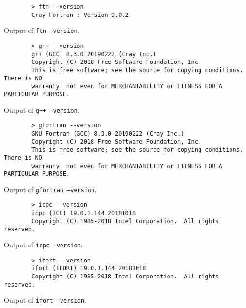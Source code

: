 \documentclass[british]{scrreprt}
\begin{document}
\begin{listing}
	\centering
	\begin{verbatim}
		> ftn --version
		Cray Fortran : Version 9.0.2
	\end{verbatim}
	\caption{Output of \texttt{ftn --version}.}
\end{listing}

\begin{listing}
	\centering
	\begin{verbatim}
		> g++ --version
		g++ (GCC) 8.3.0 20190222 (Cray Inc.)
		Copyright (C) 2018 Free Software Foundation, Inc.
		This is free software; see the source for copying conditions.  There is NO
		warranty; not even for MERCHANTABILITY or FITNESS FOR A PARTICULAR PURPOSE.

	\end{verbatim}
	\caption{Output of \texttt{g++ --version}.}
\end{listing}

\begin{listing}
	\centering
	\begin{verbatim}
		> gfortran --version
		GNU Fortran (GCC) 8.3.0 20190222 (Cray Inc.)
		Copyright (C) 2018 Free Software Foundation, Inc.
		This is free software; see the source for copying conditions.  There is NO
		warranty; not even for MERCHANTABILITY or FITNESS FOR A PARTICULAR PURPOSE.
	\end{verbatim}
	\caption{Output of \texttt{gfortran --version}.}
\end{listing}

\begin{listing}
	\centering
	\begin{verbatim}
		> icpc --version
		icpc (ICC) 19.0.1.144 20181018
		Copyright (C) 1985-2018 Intel Corporation.  All rights reserved.

	\end{verbatim}
	\caption{Output of \texttt{icpc --version}.}
\end{listing}

\begin{listing}
	\centering
	\begin{verbatim}
		> ifort --version
		ifort (IFORT) 19.0.1.144 20181018
		Copyright (C) 1985-2018 Intel Corporation.  All rights reserved.

	\end{verbatim}
	\caption{Output of \texttt{ifort --version}.}
\end{listing}
\end{document}
